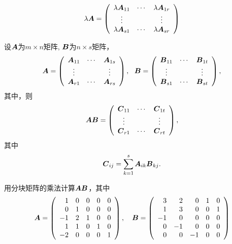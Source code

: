 \begin{dingyi}[分块矩阵的数乘]
  $$
  \lambda \boldsymbol{A} = \left(
    \begin{array}{ccc}
      \lambda \boldsymbol{A}_{11} & \cdots & \lambda \boldsymbol{A}_{1r} \\
      \vdots   &     & \vdots   \\
      \lambda \boldsymbol{A}_{s1} & \cdots & \lambda \boldsymbol{A}_{sr}
    \end{array}
  \right)
  $$    
\end{dingyi}




\begin{dingyi}[分块矩阵的乘法]
  设$\boldsymbol{A}$为$m\times n$矩阵, $\boldsymbol{B}$为$n \times s$矩阵，
  $$
  \MA = \left(
    \begin{array}{ccc}
      \MA_{11} & \cd & \MA_{1s} \\
      \vd   &     & \vd   \\
      \MA_{r1} & \cd & \MA_{rs}
    \end{array}
  \right), \ \ 
  \MB = \left(
    \begin{array}{ccc}
      \MB_{11} & \cd & \MB_{1t} \\
      \vd   &     & \vd   \\
      \MB_{s1} & \cd & \MB_{st}
    \end{array}
  \right),
  $$
  其中，则
  $$
  \boldsymbol{A} \boldsymbol{B} = \left(
    \begin{array}{ccc}
      \boldsymbol{C}_{11}   & \cdots & \boldsymbol{C}_{1t}  \\
      \vdots   &     & \vdots   \\
      \boldsymbol{C}_{r1}   & \cdots & \boldsymbol{C}_{rt}
    \end{array}
  \right),
  $$
  其中
  $$
  \boldsymbol{C}_{ij} = \sum_{k=1}^s \boldsymbol{A}_{ik} \boldsymbol{B}_{kj}.
  $$
\end{dingyi}





\begin{li} 
  用分块矩阵的乘法计算$\boldsymbol{A}\boldsymbol{B}$，其中
  $$
  \boldsymbol{A} = \left(
    \begin{array}{rrrrr}
      1&0&0&0&0\\
      0&1&0&0&0\\
      -1&2&1&0&0\\
      1&1&0&1&0\\
      -2&0&0&0&1
    \end{array}
  \right), \quad
  \boldsymbol{B} = \left(
    \begin{array}{rrrrr}
      3&2&0&1&0\\
      1&3&0&0&1\\
      -1&0&0&0&0\\
      0&-1&0&0&0\\
      0&0&-1&0&0
    \end{array}
  \right)
  $$
\end{li}



